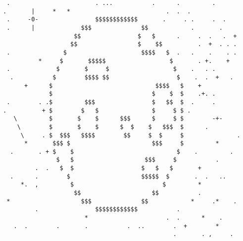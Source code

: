 \lstset{basicstyle=\ttfamily}
\begin{lstlisting}
 .                        . ...           .      .         .
.       |     *   *                           .  .  .
 .     -0-                $$$$$$$$$$$$       .     . .     .  .
 .      |             $$$              $$            .       .
                    $$                $   $      .     .  .   .  +
                   $$                 $    $$          .  +  . . .
 .               $                     $$$$   $  .   .    .    . .
          *     $       $$$$$                  $       . +.    +
 .             $       $     $                  $    .   . .
  .           $        $$$$ $$                   $    .  .  +   .
      +      $                             $$$$   $    +
             $                            $    $  $    .+. .
 .        . .$         $$$                $   $$  $  .     .
.          + $        $   $               $     $ $ .
   \         $       $    $      $$$      $     $ $        -+-
    \        $       $    $      $  $    $   $$$  $      .
     \     . $  $$$   $$$$        $$     $  $     $               .
      *       $$$ $                       $$$     $         *
  .       . + $    $                             $    .         .
               $   $                    $$$     $           .
         .  .   $  $                   $   $   $       +
  .      .        $                    $$$$$  $       .  .   ..
     *.  ,         $                         $         *
                    $$                    $$           .
 *                    $$$              $$            *     .*    .
         .                $$$$$$$$$$$$           .
                       *                      .  .      *    .
   .  .        .       .           .  ..        .  +        *
                                                .       . ,     .
\end{lstlisting}
